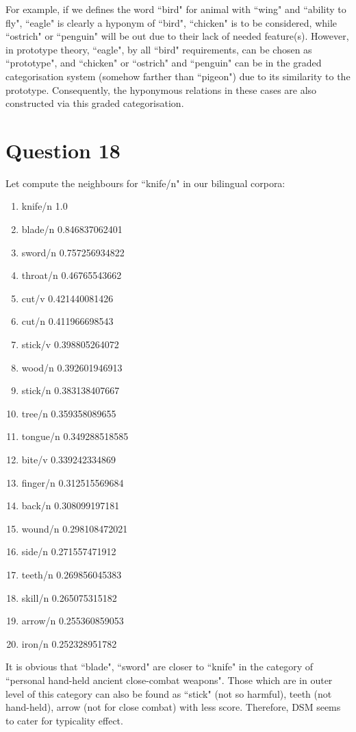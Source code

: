 \documentclass[12pt]{article}
\begin{document}
For example, if we defines the word ``bird" for animal with ``wing" and ``ability to fly", ``eagle" is clearly a hyponym of ``bird", ``chicken" is to be considered, while ``ostrich" or ``penguin" will be out due to their lack of needed feature(s). However, in prototype theory, ``eagle", by all ``bird" requirements, can be chosen as ``prototype", and ``chicken" or ``ostrich" and ``penguin" can be in the graded categorisation system (somehow farther than ``pigeon") due to its similarity to the prototype. Consequently, the hyponymous relations in these cases are also constructed via this graded categorisation.

\section{Question 18}
Let compute the neighbours for ``knife/n" in our bilingual corpora:
\begin{enumerate}
	\item knife/n 1.0
	\item blade/n 0.846837062401
	\item sword/n 0.757256934822
	\item throat/n 0.46765543662
	\item cut/v 0.421440081426
	\item cut/n 0.411966698543
	\item stick/v 0.398805264072
	\item wood/n 0.392601946913
	\item stick/n 0.383138407667
	\item tree/n 0.359358089655
	\item tongue/n 0.349288518585
	\item bite/v 0.339242334869
	\item finger/n 0.312515569684
	\item back/n 0.308099197181
	\item wound/n 0.298108472021
	\item side/n 0.271557471912
	\item teeth/n 0.269856045383
	\item skill/n 0.265075315182
	\item arrow/n 0.255360859053
	\item iron/n 0.252328951782
\end{enumerate}

It is obvious that ``blade", ``sword" are closer to ``knife" in the category of ``personal hand-held ancient close-combat weapons". Those which are in outer level of this category can also be found as ``stick" (not so harmful), teeth (not hand-held), arrow (not for close combat) with less score. Therefore, DSM seems to cater for typicality effect.

{}

\end{document}
